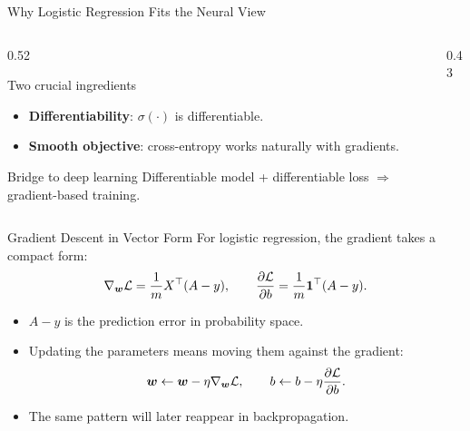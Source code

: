 \documentclass[11pt,aspectratio=169,professionalfonts]{beamer}
\begin{document}
%
\begin{frame}{Why Logistic Regression Fits the Neural View}
\begin{columns}[T]
\begin{column}{0.52\textwidth}
\begin{block}{Two crucial ingredients}
\begin{itemize}
    \item \textbf{Differentiability}: $\sigma(\cdot)$ is differentiable.
    \item \textbf{Smooth objective}: cross-entropy works naturally with gradients.
\end{itemize}
\end{block}

\vspace{0.15cm}
\begin{alertblock}{Bridge to deep learning}
Differentiable model + differentiable loss $\Rightarrow$ gradient-based training.
\end{alertblock}
\end{column}
\begin{column}{0.43\textwidth}
\end{column}
\end{columns}
\end{frame}
%
%
\begin{frame}{Gradient Descent in Vector Form}
For logistic regression, the gradient takes a compact form:
\[
\nabla_{\bm{w}}\mathcal{L}=\frac{1}{m}X^{\top}(A-y),
\qquad
\frac{\partial \mathcal{L}}{\partial b}=\frac{1}{m}\mathbf{1}^{\top}(A-y).
\]

\vspace{0.2cm}
\begin{itemize}
    \item $A-y$ is the prediction error in probability space.
    \item Updating the parameters means moving them against the gradient:
    \[
    \bm{w} \leftarrow \bm{w} - \eta \nabla_{\bm{w}}\mathcal{L},
    \qquad
    b \leftarrow b - \eta \frac{\partial \mathcal{L}}{\partial b}.
    \]
    \item The same pattern will later reappear in backpropagation.
\end{itemize}
\end{frame}
\end{document}
